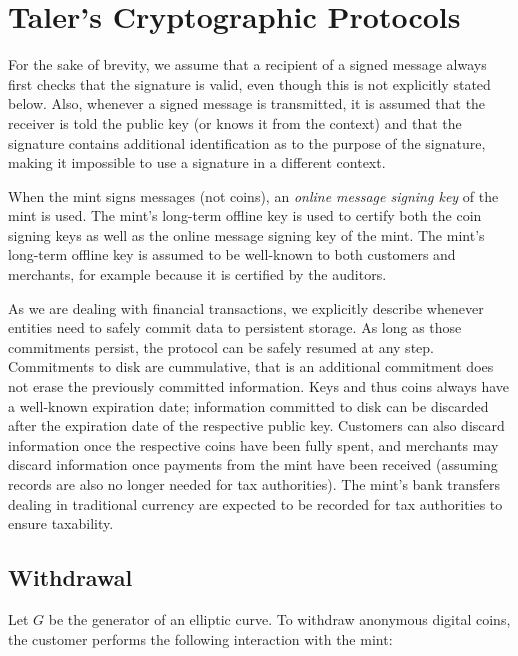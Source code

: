 \documentclass{llncs}
\begin{document}
\section{Taler's Cryptographic Protocols}


For the sake of brevity, we assume that a recipient of a signed
message always first checks that the signature is valid, even though
this is not explicitly stated below.  Also, whenever a signed message
is transmitted, it is assumed that the receiver is told the public key
(or knows it from the context) and that the signature contains
additional identification as to the purpose of the signature, making
it impossible to use a signature in a different context.

When the mint signs messages (not coins), an {\em online message
  signing key} of the mint is used.  The mint's long-term offline key
is used to certify both the coin signing keys as well as the online
message signing key of the mint.  The mint's long-term offline key is
assumed to be well-known to both customers and merchants, for example
because it is certified by the auditors.

As we are dealing with financial transactions, we explicitly describe
whenever entities need to safely commit data to persistent storage.
As long as those commitments persist, the protocol can be safely
resumed at any step.  Commitments to disk are cummulative, that is an
additional commitment does not erase the previously committed
information.  Keys and thus coins always have a well-known expiration
date; information committed to disk can be discarded after the
expiration date of the respective public key.  Customers can also
discard information once the respective coins have been fully spent,
and merchants may discard information once payments from the mint have
been received (assuming records are also no longer needed for tax
authorities).  The mint's bank transfers dealing in traditional
currency are expected to be recorded for tax authorities to ensure
taxability.

\subsection{Withdrawal}

Let $G$ be the generator of an elliptic curve.  To withdraw anonymous
digital coins, the customer performs the following interaction with
the mint:
\end{document}
